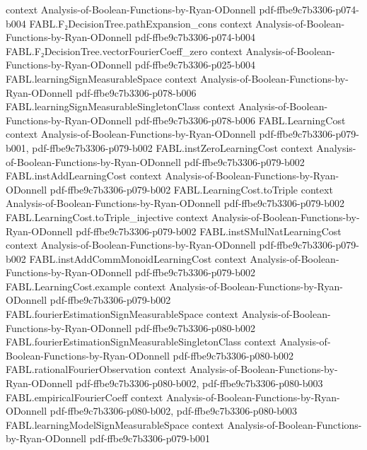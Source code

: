 \begin{theorem}
  {context}
  {Analysis-of-Boolean-Functions-by-Ryan-ODonnell}
  {pdf-ffbe9c7b3306-p074-b004}
\proofstep
  {FABL.F₂DecisionTree.pathExpansion_cons}
  {context}
  {Analysis-of-Boolean-Functions-by-Ryan-ODonnell}
  {pdf-ffbe9c7b3306-p074-b004}
\proofstep
  {FABL.F₂DecisionTree.vectorFourierCoeff_zero}
  {context}
  {Analysis-of-Boolean-Functions-by-Ryan-ODonnell}
  {pdf-ffbe9c7b3306-p025-b004}
\proofstep
  {FABL.learningSignMeasurableSpace}
  {context}
  {Analysis-of-Boolean-Functions-by-Ryan-ODonnell}
  {pdf-ffbe9c7b3306-p078-b006}
\proofstep
  {FABL.learningSignMeasurableSingletonClass}
  {context}
  {Analysis-of-Boolean-Functions-by-Ryan-ODonnell}
  {pdf-ffbe9c7b3306-p078-b006}
\proofstep
  {FABL.LearningCost}
  {context}
  {Analysis-of-Boolean-Functions-by-Ryan-ODonnell}
  {pdf-ffbe9c7b3306-p079-b001,
    pdf-ffbe9c7b3306-p079-b002}
\proofstep
  {FABL.instZeroLearningCost}
  {context}
  {Analysis-of-Boolean-Functions-by-Ryan-ODonnell}
  {pdf-ffbe9c7b3306-p079-b002}
\proofstep
  {FABL.instAddLearningCost}
  {context}
  {Analysis-of-Boolean-Functions-by-Ryan-ODonnell}
  {pdf-ffbe9c7b3306-p079-b002}
\proofstep
  {FABL.LearningCost.toTriple}
  {context}
  {Analysis-of-Boolean-Functions-by-Ryan-ODonnell}
  {pdf-ffbe9c7b3306-p079-b002}
\proofstep
  {FABL.LearningCost.toTriple_injective}
  {context}
  {Analysis-of-Boolean-Functions-by-Ryan-ODonnell}
  {pdf-ffbe9c7b3306-p079-b002}
\proofstep
  {FABL.instSMulNatLearningCost}
  {context}
  {Analysis-of-Boolean-Functions-by-Ryan-ODonnell}
  {pdf-ffbe9c7b3306-p079-b002}
\proofstep
  {FABL.instAddCommMonoidLearningCost}
  {context}
  {Analysis-of-Boolean-Functions-by-Ryan-ODonnell}
  {pdf-ffbe9c7b3306-p079-b002}
\proofstep
  {FABL.LearningCost.example}
  {context}
  {Analysis-of-Boolean-Functions-by-Ryan-ODonnell}
  {pdf-ffbe9c7b3306-p079-b002}
\proofstep
  {FABL.fourierEstimationSignMeasurableSpace}
  {context}
  {Analysis-of-Boolean-Functions-by-Ryan-ODonnell}
  {pdf-ffbe9c7b3306-p080-b002}
\proofstep
  {FABL.fourierEstimationSignMeasurableSingletonClass}
  {context}
  {Analysis-of-Boolean-Functions-by-Ryan-ODonnell}
  {pdf-ffbe9c7b3306-p080-b002}
\proofstep
  {FABL.rationalFourierObservation}
  {context}
  {Analysis-of-Boolean-Functions-by-Ryan-ODonnell}
  {pdf-ffbe9c7b3306-p080-b002,
    pdf-ffbe9c7b3306-p080-b003}
\proofstep
  {FABL.empiricalFourierCoeff}
  {context}
  {Analysis-of-Boolean-Functions-by-Ryan-ODonnell}
  {pdf-ffbe9c7b3306-p080-b002,
    pdf-ffbe9c7b3306-p080-b003}
\proofstep
  {FABL.learningModelSignMeasurableSpace}
  {context}
  {Analysis-of-Boolean-Functions-by-Ryan-ODonnell}
  {pdf-ffbe9c7b3306-p079-b001}

\end{theorem}
